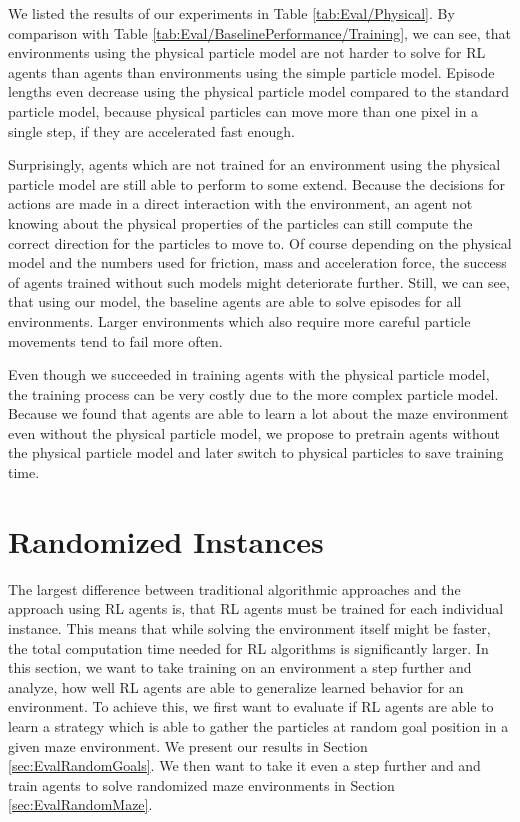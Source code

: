 We listed the results of our experiments in Table \ref{tab:Eval/Physical}. By comparison with Table \ref{tab:Eval/BaselinePerformance/Training}, we can see, that environments using the physical particle model are not harder to solve for RL agents than agents than environments using the simple particle model. Episode lengths even decrease using the physical particle model compared to the standard particle model, because physical particles can move more than one pixel in a single step, if they are accelerated fast enough. 

Surprisingly, agents which are not trained for an environment using the physical particle model are still able to perform to some extend. Because the decisions for actions are made in a direct interaction with the environment, an agent not knowing about the physical properties of the particles can still compute the correct direction for the particles to move to. Of course depending on the physical model and the numbers used for friction, mass and acceleration force, the success of agents trained without such models might deteriorate further. Still, we can see, that using our model, the baseline agents are able to solve episodes for all environments. Larger environments which also require more careful particle movements tend to fail more often. 

Even though we succeeded in training agents with the physical particle model, the training process can be very costly due to the more complex particle model. Because we found that agents are able to learn a lot about the maze environment even without the physical particle model, we propose to pretrain agents without the physical particle model and later switch to physical particles to save training time. 

\section{Randomized Instances} \label{sec:EvalRandomness}
The largest difference between traditional algorithmic approaches and the approach using RL agents is, that RL agents must be trained for each individual instance. This means that while solving the environment itself might be faster, the total computation time needed for RL algorithms is significantly larger. In this section, we want to take training on an environment a step further and analyze, how well RL agents are able to generalize learned behavior for an environment. To achieve this, we first want to evaluate if RL agents are able to learn a strategy which is able to gather the particles at random goal position in a given maze environment. We present our results in Section \ref{sec:EvalRandomGoals}. We then want to take it even a step further and and train agents to solve randomized maze environments in Section \ref{sec:EvalRandomMaze}. 

